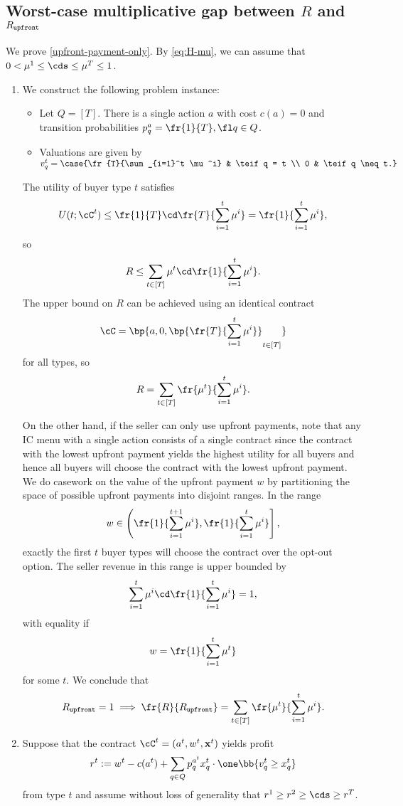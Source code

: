 \subsection{Worst-case multiplicative gap between $R$ and $R_\mathtt{upfront}$} \label{upfront-payment-only-proof}

We prove \cref{upfront-payment-only}. By \cref{eq:H-mu}, we can assume that $0<\mu^1\le \cds \le \mu^T \le 1$.
\begin{enumerate}
        \item We construct the following problem instance:
        \begin{itemize}
            \item Let $Q = [T]$. There is a single action $a$ with cost $c(a) = 0$ and transition probabilities $p^a_q = \fr{1}{T},\fl q\in Q$.
            \item Valuations are given by $v^t_q = \case{\fr{T}{\sum_{i=1}^t \mu^i} & \teif q = t \\ 0 & \teif q \neq t.}$
        \end{itemize}

        The utility of buyer type $t$ satisfies $$U(t;\cC^t) \le \fr{1}{T} \cd \fr{T}{\sum_{i=1}^t \mu^i} = \fr{1}{\sum_{i=1}^t \mu^i},$$ so $$R \le \sum_{t\in [T]} \mu^t \cd \fr{1}{\sum_{i=1}^t \mu^i}.$$ The upper bound on $R$ can be achieved using an identical contract $$\cC = \bp{a, 0, \bp{\fr{T}{\sum_{i=1}^t \mu^i}}_{t\in [T]}}$$ for all types, so $$R = \sum_{t\in [T]} \fr{\mu^t}{\sum_{i=1}^t \mu^i}.$$
        
        On the other hand, if the seller can only use upfront payments, note that any IC menu with a single action consists of a single contract since the contract with the lowest upfront payment yields the highest utility for all buyers and hence all buyers will choose the contract with the lowest upfront payment. We do casework on the value of the upfront payment $w$ by partitioning the space of possible upfront payments into disjoint ranges. In the range $$w\in \left(\fr{1}{\sum_{i=1}^{t+1} \mu^i}, \fr{1}{\sum_{i=1}^{t} \mu^i}\right],$$ exactly the first $t$ buyer types will choose the contract over the opt-out option. The seller revenue in this range is upper bounded by $$\sum_{i=1}^t \mu^i \cd \fr{1}{\sum_{i=1}^{t} \mu^i} = 1,$$ with equality if $$w = \fr{1}{\sum_{i=1}^{t} \mu^t}$$ for some $t$. We conclude that $$\Rupfront = 1\implies \fr{R}{\Rupfront} = \sum_{t\in [T]} \fr{\mu^t}{\sum_{i=1}^t \mu^i}.$$

        \item Suppose that the contract $\cC^t = (a^t, w^t, \mathbf{x}^t)$ yields profit $$r^t := w^t - c(a^t) + \sum_{q\in Q} p^{a^t}_q x^t_q \cdot \one\bb{v^t_q \ge x^t_q}  $$ from type $t$ and assume without loss of generality that $r^1 \ge r^2 \ge \cds \ge r^T$. 
        

\end{enumerate}
